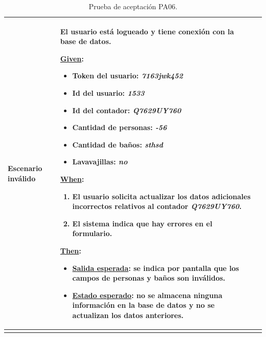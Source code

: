 \documentclass[pdftex,11pt,a4paper]{book}
\begin{document}
\begin{center}
\begin{longtable}{|>{\centering\arraybackslash}X m{2cm}|m{12cm}|}
\\ \hline
\textbf{Escenario inválido} & {\raggedright El usuario está logueado y tiene conexión con la base de datos.\par}
\vspace{2mm}
\break

\underline{Given}:
\vspace{-3mm}
\begin{itemize}
\addtolength{\itemsep}{-3mm}
\item Token del usuario: \textit{7163jwk452}
\item Id del usuario: \textit{1533}
\item Id del contador: \textit{Q7629UY760}
\item Cantidad de personas: \textit{-56}
\item Cantidad de baños: \textit{sthsd}
\item Lavavajillas: \textit{no}

\end{itemize}

\underline{When}:
\begin{enumerate}
\vspace{-3mm}
\addtolength{\itemsep}{-3mm}
\item El usuario solicita actualizar los datos adicionales incorrectos relativos al contador \textit{Q7629UY760}.
\item El sistema indica que hay errores en el formulario.

\end{enumerate}
\break

\underline{Then}:
\vspace{-3mm}
\begin{itemize}
\addtolength{\itemsep}{-3mm}
\item \underline{Salida esperada}: se indica por pantalla que los campos de personas y baños son inválidos.
\item \underline{Estado esperado}: no se almacena ninguna información en la base de datos y no se actualizan los datos anteriores.
\end{itemize}
\\ \hline

\caption{Prueba de aceptación PA06.} \label{tablalarga:tablaPA06}
\end{longtable}
\end{center}


\renewcommand{\tablename}{Tabla}
\renewcommand{\arraystretch}{1,7}
\end{document}
